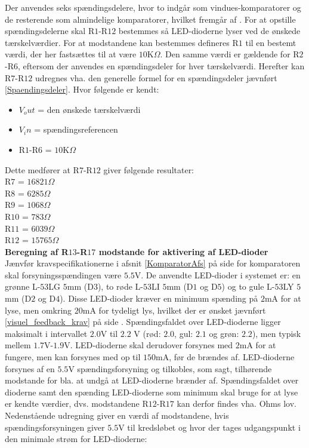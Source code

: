 Der anvendes seks spændingsdelere, hvor to indgår som vindues-komparatorer og de resterende som almindelige komparatorer, hvilket fremgår af  .
For at opstille spændingsdelerne skal R$1$-R$12$ bestemmes så LED-dioderne lyser ved de ønskede tærskelværdier. For at modstandene kan bestemmes defineres R$1$ til en bestemt værdi, der her fastsættes til at være $10$K$\Omega$. Den samme værdi er gældende for R$2$-R$6$, eftersom der anvendes en spændingsdeler for hver tærskelværdi. Herefter kan R$7$-R$12$ udregnes vha. den generelle formel for en spændingsdeler jævnført \eqref{Spaendingsdeler}. Hvor følgende er kendt:
\begin{itemize}
\item $V_out$ = den ønskede tærskelværdi
\item $V_in$ = spændingsreferencen
\item R$1$-R$6$ = $10$K$\Omega$
\end{itemize}

Dette medfører at R$7$-R$12$ giver følgende resultater:\\
R$7$ = $16821\Omega$ \\
R$8$ = $6285\Omega$ \\
R$9$ = $1068\Omega$ \\
R$10$ = $783\Omega$ \\
R$11$ = $6039\Omega$ \\
R$12$ = $15765\Omega$ \\


\noindent\textbf{Beregning af R$13$-R$17$ modstande for aktivering af LED-dioder} \\
Jænvfør kravspecifikationerne i afsnit \ref{KomparatorAfs} på side \pageref{KomparatorAfs} for komparatoren skal forsyningsspændingen være $5.5$V. De anvendte LED-dioder i systemet er: en grønne L-$53$LG $5$mm (D$3$), to røde L-$53$LI $5$mm (D$1$ og D$5$) og to gule L-$53$LY $5$mm (D$2$ og D$4$). Disse LED-dioder kræver en minimum spænding på $2$mA for at lyse, men omkring $20$mA for tydeligt lys, hvilket der er ønsket jævnført \ref{visuel_feedback_krav} på side \pageref{visuel_feedback_krav}.  Spændingsfaldet over LED-dioderne ligger maksimalt i intervallet $2.0$V til $2.2$ V (rød: $2.0$, gul: $2.1$ og grøn: $2.2$), men typisk mellem $1.7$V-$1.9$V. LED-dioderne skal derudover forsynes med $2$mA for at fungere, men kan forsynes med op til $150$mA, før de brændes af. LED-dioderne forsynes af en $5.5$V spændingsforsyning og tilkobles, som sagt, tilhørende modstande for bla. at undgå at LED-dioderne brænder af. Spændingsfaldet over dioderne samt den spænding LED-dioderne som minimum skal bruge for at lyse er kendte værdier, dvs. modstandene R$12$-R$17$ kan derfor findes vha. Ohms lov. Nedenstående udregning giver en værdi af modstandene, hvis spændingsforsyningen giver $5.5$V til kredsløbet og hvor der tages udgangspunkt i den minimale strøm for LED-dioderne:


